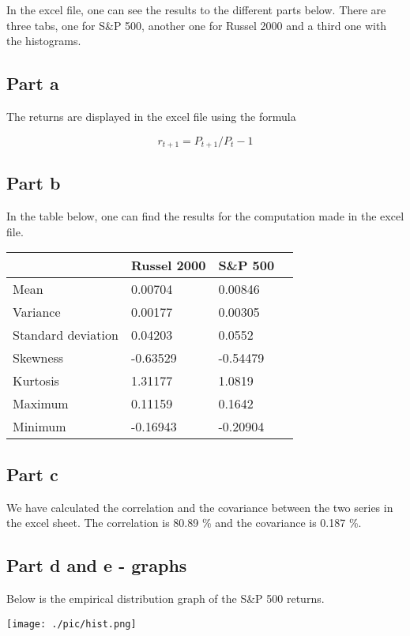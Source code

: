 \documentclass[a4paper,11pt,twoside]{article}
\def \be {\begin{equation}}
\def \ee {\end{equation}}
\begin{document}
In the excel file, one can see the results to the different parts below. There are three tabs, one for S\&P 500, another one for Russel 2000 and a third one with the histograms.

\subsection*{Part a}

The returns are displayed in the excel file using the formula 

\be
r_{t+1}=P_{t+1}/P_{t} -1
\ee

\subsection*{Part b}
In the table below, one can find the results for the computation made in the excel file. 
\begin{center}
\begin{tabular}{ | l | l | l | }
	\hline
	 & Russel 2000 & S\&P 500 \  \\ \hline
	Mean & 0.00704 & 0.00846 \\ \hline
	Variance & 0.00177 & 0.00305 \\ \hline
	Standard deviation & 0.04203 & 0.0552 \\ \hline
	Skewness & -0.63529 & -0.54479 \\ \hline
	Kurtosis & 1.31177& 1.0819 \\ \hline
	Maximum & 0.11159 & 0.1642 \\ \hline
	Minimum & -0.16943 & -0.20904 \\ \hline
\end{tabular}
\end{center}

\subsection*{Part c}

We have calculated the correlation and the covariance between the two series in the excel sheet. The correlation is 80.89 \% and the covariance is 0.187 \%.

\subsection*{Part d and e - graphs}
Below is the empirical distribution graph of the S\&P 500 returns.

\begin{center}
	\texttt{[image: ./pic/hist.png]}
\end{center}
\end{document}
